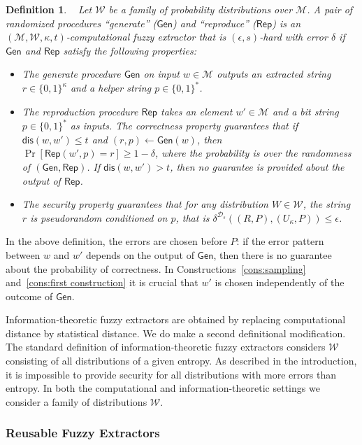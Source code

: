 \documentclass[11pt]{article}
\newcommand{\class}[1]{{\ensuremath{\mathsf{#1}}}}
\newcommand{\gen}{\ensuremath{\class{Gen}}\xspace}
\newcommand{\rep}{\ensuremath{\class{Rep}}\xspace}
\newcommand{\dis}{\ensuremath{\mathsf{dis}}}
\newtheorem{definition}[theorem]{Definition}
\begin{document}
\begin{definition}~\cite[Definition 2.5]{fuller2013computational}
\label{def:comp fuzzy extractor}
Let $\mathcal{W}$ be a family of probability distributions over $\mathcal{M}$. A pair of randomized procedures ``generate'' ($\gen$) and ``reproduce'' ($\rep$) is an $(\mathcal{M}, \mathcal{W}, \kappa, t)$-\emph{computational fuzzy extractor} that is $(\epsilon, s)$-hard with error $\delta$ if \gen and \rep satisfy the following properties:
\begin{itemize}
\item The generate procedure \gen on input $w\in \mathcal{M}$ outputs an extracted string $r\in\{0,1\}^\kappa$ and a helper string $p\in\{0,1\}^*$.
\item The reproduction procedure \rep takes an element $w'\in\mathcal{M}$ and a bit string $p\in\{0,1\}^*$ as inputs.  The \emph{correctness} property guarantees that if $\dis(w, w')\leq t$ and $(r, p)\leftarrow \gen(w)$, then $\Pr[\rep( w', p) = r] \geq 1-\delta$, where the probability is over the randomness of $(\gen, \rep)$.
If $\dis(w, w') > t$, then no guarantee is provided about the output of \rep.
\item The \emph{security} property guarantees that for any distribution $W\in \mathcal{W}$, the string $r$ is pseudorandom conditioned on $p$, that is $\delta^{\mathcal{D}_s}((R, P), (U_\kappa, P))\leq \epsilon$.
\end{itemize}
\end{definition}
In the above definition, the errors are chosen before $P$: if the error pattern between $w$ and $w'$ depends on the output of $\gen$, then there is no guarantee about the probability of correctness. In Constructions~\ref{cons:sampling} and~\ref{cons:first construction} it is crucial that $w'$ is chosen independently of the outcome of \gen.

Information-theoretic fuzzy extractors are obtained by replacing computational distance by statistical distance.  We do make a second definitional modification.  The standard definition of information-theoretic fuzzy extractors considers $\mathcal{W}$  consisting of all distributions of a given entropy.  As described in the introduction, it is impossible to provide security for all distributions with more errors than entropy.  In both the computational and information-theoretic settings we consider a family of distributions $\mathcal{W}$.

\subsubsection{Reusable Fuzzy Extractors}
\label{sec:reusable}
\end{document}
